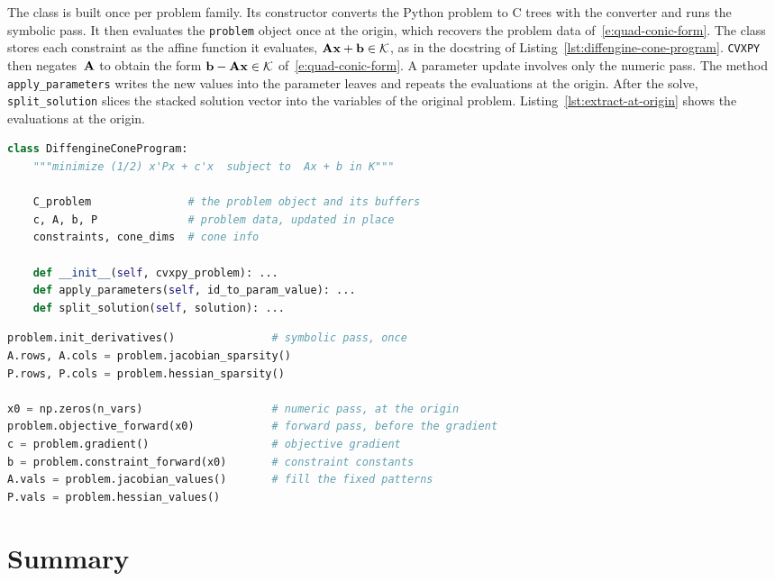 The class is built once per problem family. Its constructor converts the Python problem
to C trees with the converter and runs the symbolic pass. It then evaluates the
\texttt{problem} object once at the origin, which recovers the problem data
of~\eqref{e:quad-conic-form}.
The class stores each constraint as the affine function it evaluates, $\mathbf{A}\mathbf{x} +
\mathbf{b} \in \mathcal{K}$, as in the docstring of Listing~\ref{lst:diffengine-cone-program}.
\texttt{CVXPY} then negates~$\mathbf{A}$ to obtain the form
$\mathbf{b} - \mathbf{A}\mathbf{x} \in \mathcal{K}$ of~\eqref{e:quad-conic-form}. A parameter update
involves only the numeric pass. The method \texttt{apply\_parameters} writes the new
values into the parameter leaves and repeats the evaluations at the origin. After the
solve, \texttt{split\_solution} slices the stacked solution vector into the variables of
the original problem. Listing~\ref{lst:extract-at-origin} shows the evaluations at the
origin.
\begin{lstlisting}[language=Python, showstringspaces=false, caption={A simplified version of
the \texttt{DiffengineConeProgram} class.}, label=lst:diffengine-cone-program]
class DiffengineConeProgram:
    """minimize (1/2) x'Px + c'x  subject to  Ax + b in K"""

    C_problem               # the problem object and its buffers
    c, A, b, P              # problem data, updated in place
    constraints, cone_dims  # cone info

    def __init__(self, cvxpy_problem): ...
    def apply_parameters(self, id_to_param_value): ...
    def split_solution(self, solution): ...
\end{lstlisting}
\begin{lstlisting}[language=Python, caption={A simplified version of the evaluations at
the origin that recover the problem data.}, label=lst:extract-at-origin]
problem.init_derivatives()               # symbolic pass, once
A.rows, A.cols = problem.jacobian_sparsity()
P.rows, P.cols = problem.hessian_sparsity()

x0 = np.zeros(n_vars)                    # numeric pass, at the origin
problem.objective_forward(x0)            # forward pass, before the gradient
c = problem.gradient()                   # objective gradient
b = problem.constraint_forward(x0)       # constraint constants
A.vals = problem.jacobian_values()       # fill the fixed patterns
P.vals = problem.hessian_values()
\end{lstlisting}

\section{Summary}\label{sec:theme1-summary}

